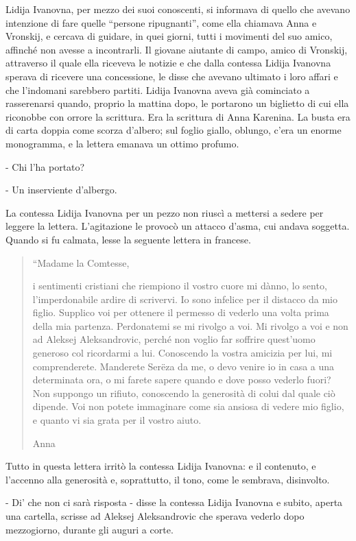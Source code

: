 Lidija Ivanovna, per mezzo dei suoi conoscenti, si informava di quello che avevano intenzione di fare quelle ``persone ripugnanti'', come ella chiamava Anna e Vronskij, e cercava di guidare, in quei giorni, tutti i movimenti del suo amico, affinché non avesse a incontrarli. Il giovane aiutante di campo, amico di Vronskij, attraverso il quale ella riceveva le notizie e che dalla contessa Lidija Ivanovna sperava di ricevere una concessione, le disse che avevano ultimato i loro affari e che l'indomani sarebbero partiti. Lidija Ivanovna aveva già cominciato a rasserenarsi quando, proprio la mattina dopo, le portarono un biglietto di cui ella riconobbe con orrore la scrittura. Era la scrittura di Anna Karenina. La busta era di carta doppia come scorza d'albero; sul foglio giallo, oblungo, c'era un enorme monogramma, e la lettera emanava un ottimo profumo. 

- Chi l'ha portato? 

- Un inserviente d'albergo. 

La contessa Lidija Ivanovna per un pezzo non riuscì a mettersi a sedere per leggere la lettera. L'agitazione le provocò un attacco d'asma, cui andava soggetta. Quando si fu calmata, lesse la seguente lettera in francese. 

\begin{quote}
``Madame la Comtesse, 

i sentimenti cristiani che riempiono il vostro cuore mi dànno, lo sento, l'imperdonabile ardire di scrivervi. Io sono infelice per il distacco da mio figlio. Supplico voi per ottenere il permesso di vederlo una volta prima della mia partenza. Perdonatemi se mi rivolgo a voi. Mi rivolgo a voi e non ad Aleksej Aleksandrovic, perché non voglio far soffrire quest'uomo generoso col ricordarmi a lui. Conoscendo la vostra amicizia per lui, mi comprenderete. Manderete Serëza da me, o devo venire io in casa a una determinata ora, o mi farete sapere quando e dove posso vederlo fuori? Non suppongo un rifiuto, conoscendo la generosità di colui dal quale ciò dipende. Voi non potete immaginare come sia ansiosa di vedere mio figlio, e quanto vi sia grata per il vostro aiuto. 

Anna
\end{quote}
\enlargethispage*{1\baselineskip}

Tutto in questa lettera irritò la contessa Lidija Ivanovna: e il contenuto, e l'accenno alla generosità e, soprattutto, il tono, come le sembrava, disinvolto. 

- Di' che non ci sarà risposta - disse la contessa Lidija Ivanovna e subito, aperta una cartella, scrisse ad Aleksej Aleksandrovic che sperava vederlo dopo mezzogiorno, durante gli auguri a corte. 


